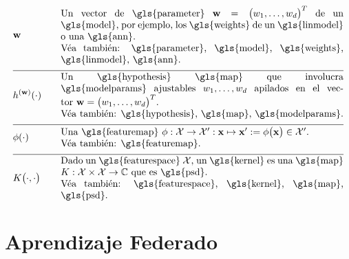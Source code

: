 \begin{align} 
	&\weights  &\quad & \parbox{.85\textwidth}{Un vector de \gls{parameter} $\weights = \big(\weight_{1}, \ldots, \weight_{\featuredim}\big)^{T}$ 
		de un \gls{model}, por ejemplo, los \gls{weights} de un \gls{linmodel} o una \gls{ann}.
		\\ Véa también: \gls{parameter}, \gls{model}, \gls{weights}, \gls{linmodel}, \gls{ann}.} \nonumber \\[2mm] \hline \nonumber\\[-5mm]
	&\hypothesis^{(\weights)}(\cdot)  &\quad &\parbox{.85\textwidth}{Un \gls{hypothesis} \gls{map} que involucra \gls{modelparams} ajustables 
		$\weight_{1}, \ldots, \weight_{\featuredim}$ apilados en el vector $\weights=\big(\weight_{1}, \ldots, \weight_{\featuredim} \big)^{T}$.
		\\ Véa también: \gls{hypothesis}, \gls{map}, \gls{modelparams}.} \nonumber \\[2mm] \hline \nonumber\\[-5mm]
	&\featuremap(\cdot)  &\quad & \parbox{.85\textwidth}{Una \gls{featuremap} 
		$\featuremap: \featurespace \rightarrow \featurespace' : \featurevec \mapsto \featurevec' \defeq \featuremap\big( \featurevec \big) \in \featurespace'$.
		\\ Véa también: \gls{featuremap}.} \nonumber \\[2mm] \hline \nonumber\\[-5mm]
	&\kernelmap{\cdot}{\cdot} &\quad & \parbox{.85\textwidth}{Dado un \gls{featurespace} $\featurespace$, 
		un \gls{kernel} es una \gls{map} $\kernel: \featurespace \times \featurespace \rightarrow \mathbb{C}$ que es \gls{psd}.
		\\ Véa también: \gls{featurespace}, \gls{kernel}, \gls{map}, \gls{psd}.} \nonumber 
\end{align}





\newpage
\section*{Aprendizaje Federado}

